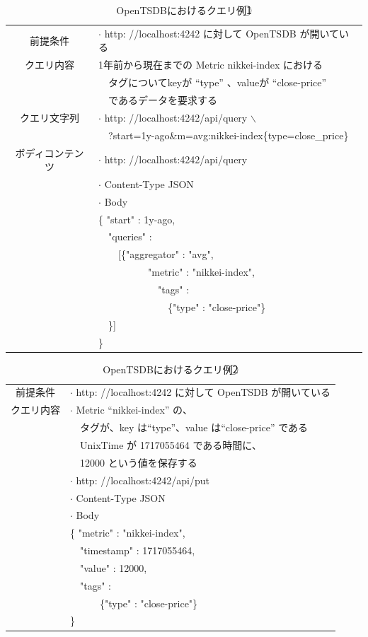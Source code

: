 \documentclass{scrartcl}
\begin{document}
\begin{table}[htbp]
\caption{OpenTSDBにおけるクエリ例\textcircled{\scriptsize 1}}
\centering
\begin{tabular}{|c|l|}
\hline
前提条件 & \(\cdot\) http: //localhost:4242 に対して OpenTSDB が開いている\\
クエリ内容 & 1年前から現在までの Metric nikkei-index における\\
 & 　タグについてkeyが ``type'' 、valueが ``close-price''\\
 & 　であるデータを要求する\\
\hline
クエリ文字列 & \(\cdot\) http: //localhost:4242/api/query $\backslash$\\
 & 　?start=1y-ago\&m=avg:nikkei-index\{type=close\_price\}\\
\hline
ボディコンテンツ & \(\cdot\) http: //localhost:4242/api/query\\
 & \(\cdot\) Content-Type JSON\\
 & \(\cdot\) Body\\
 & \{ "start" : 1y-ago,\\
 & 　"queries" :\\
 & 　　[\{"aggregator" : "avg",\\
 & 　　　　　"metric" : "nikkei-index",\\
 & 　　　　　　"tags" :\\
 & 　　　　　　　\{"type" : "close-price"\}\\
 & 　\}]\\
 & \}\\
\hline
\end{tabular}
\end{table}

\begin{table}[htbp]
\caption{OpenTSDBにおけるクエリ例\textcircled{\scriptsize 2}}
\centering
\begin{tabular}{|c|l|}
\hline
前提条件 & \(\cdot\) http: //localhost:4242 に対して OpenTSDB が開いている\\
クエリ内容 & \(\cdot\) Metric ``nikkei-index'' の、\\
 & 　タグが、key は``type''、value は``close-price'' である\\
 & 　UnixTime が 1717055464 である時間に、\\
 & 　12000 という値を保存する\\
\hline
 & \(\cdot\) http: //localhost:4242/api/put\\
 & \(\cdot\) Content-Type JSON\\
 & \(\cdot\) Body\\
 & \{ "metric" : "nikkei-index",\\
 & 　"timestamp" : 1717055464,\\
 & 　"value" : 12000,\\
 & 　"tags" :\\
 & 　　　\{"type" : "close-price"\}\\
 & \}\\
\hline
\end{tabular}
\end{table}
\end{document}
